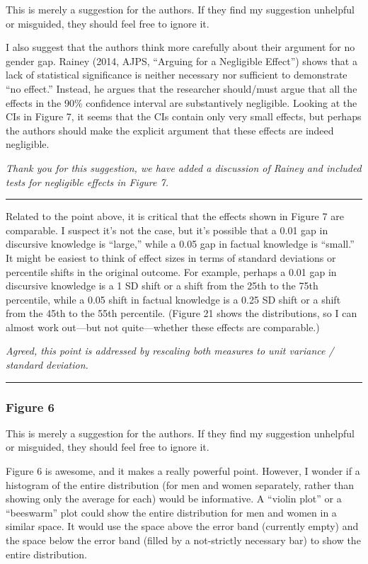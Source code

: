 This is merely a suggestion for the authors. If they find my suggestion unhelpful or misguided, they should feel free to ignore it.

I also suggest that the authors think more carefully about their argument for no gender gap. Rainey (2014, AJPS, “Arguing for a Negligible Effect”) shows that a lack of statistical significance is neither necessary nor sufficient to demonstrate “no effect.” Instead, he argues that the researcher should/must argue that all the effects in the 90\% confidence interval are substantively negligible. Looking at the CIs in Figure 7, it seems that the CIs contain only very small effects, but perhaps the authors should make the explicit argument that these effects are indeed negligible.

\textit{Thank you for this suggestion, we have added a discussion of Rainey and included tests for negligible effects in Figure 7.}

\rule{\linewidth}{.01cm}

Related to the point above, it is critical that the effects shown in Figure 7 are comparable. I suspect it’s not the case, but it’s possible that a 0.01 gap in discursive knowledge is “large,” while a 0.05 gap in factual knowledge is “small.” It might be easiest to think of effect sizes in terms of standard deviations or percentile shifts in the original outcome. For example, perhaps a 0.01 gap in discursive knowledge is a 1 SD shift or a shift from the 25th to the 75th percentile, while a 0.05 shift in factual knowledge is a 0.25 SD shift or a shift from the 45th to the 55th percentile. (Figure 21 shows the distributions, so I can almost work out—but not quite—whether these effects are comparable.)

\textit{Agreed, this point is addressed by rescaling both measures to unit variance / standard deviation.}

\rule{\linewidth}{.01cm}


\subsubsection*{Figure 6}

This is merely a suggestion for the authors. If they find my suggestion unhelpful or misguided, they should feel free to ignore it.

Figure 6 is awesome, and it makes a really powerful point. However, I wonder if a histogram of the entire distribution (for men and women separately, rather than showing only the average for each) would be informative. A “violin plot” or a “beeswarm” plot could show the entire distribution for men and women in a similar space. It would use the space above the error band (currently empty) and the space below the error band (filled by a not-strictly necessary bar) to show the entire distribution.

